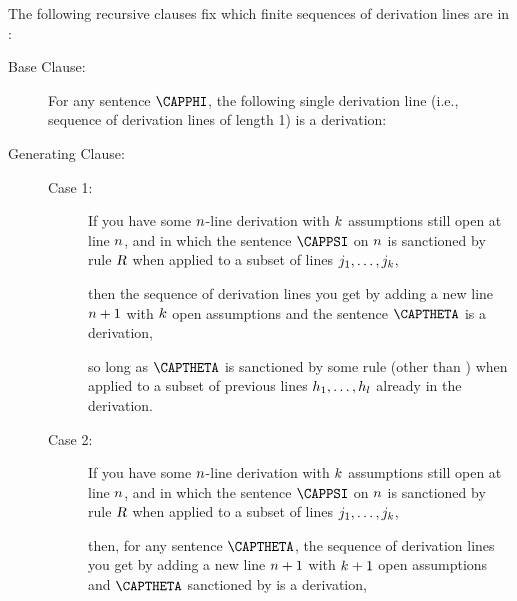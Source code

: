 \begin{majorILnc}{} The following recursive clauses fix which finite sequences of derivation lines are  in \GSD{}:
\begin{description}
\item[Base Clause:] For any \GSL{} sentence $\CAPPHI$, the following single derivation line (i.e., sequence of derivation lines of length 1) is a derivation: 
\begin{gproofnn}
\end{gproofnn}
\item[Generating Clause:] \hfill{}
\begin{description}
\item[Case 1:] If you have some $n$-line derivation with $k$ assumptions still open at line $n$, and in which the sentence $\CAPPSI$ on $n$ is sanctioned by rule $\textsl{R}$ when applied to a subset of lines $j_1,\ldots,j_k$, 
\begin{gproofnn}
\glinend{}{}{}
\glinend{}{$\qquad\vdots$}{}
\glinend{}{}{}
\end{gproofnn}
then the sequence of derivation lines you get by adding a new line $n+1$ with $k$ open assumptions and the sentence $\CAPTHETA$ is a derivation,
\begin{gproofnn}
\glinend{}{}{}
\glinend{}{$\qquad\vdots$}{}
\glinend{}{}{}
\end{gproofnn}
so long as $\CAPTHETA$ is sanctioned by some rule  (other than ) when applied to a subset of previous lines $h_1,\ldots,h_l$ already in the derivation. 

\item[Case 2:] If you have some $n$-line derivation with $k$ assumptions still open at line $n$, and in which the sentence $\CAPPSI$ on $n$ is sanctioned by rule $\textsl{R}$ when applied to a subset of lines $j_1,\ldots,j_k$, 
\begin{gproofnn}
\glinend{}{}{}
\glinend{}{$\qquad\vdots$}{}
\glinend{}{}{}
\end{gproofnn}
then, for any sentence $\CAPTHETA$, the sequence of derivation lines you get by adding a new line $n+1$ with $k+1$ open assumptions and $\CAPTHETA$ sanctioned by  is a derivation,
\begin{gproofnn}
\glinend{}{}{}
\glinend{}{$\qquad\vdots$}{}
\glinend{}{}{}
\end{gproofnn}


\end{description}
\end{description}
\end{majorILnc}
